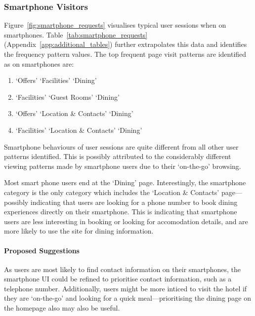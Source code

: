 \begin{landscape}
\pagestyle{empty}
\end{landscape}

\subsubsection{Smartphone Visitors}
\label{sec:results:platform:smartphone}

Figure~\ref{fig:smartphone_requests} visualises typical user sessions when on smartphones. Table~\ref{tab:smartphone_requests}  (Appendix~\ref{app:additional_tables}) further extrapolates this data and identifies the frequency pattern values. The top frequent page visit patterns are identified as on smartphones are:

\begin{enumerate}
  \item `Offers' \ra{} `Facilities' \ra{} `Dining'
  \item `Facilities' \ra{} `Guest Rooms' \ra{} `Dining'
  \item `Offers' \ra{} `Location \& Contacts' \ra{} `Dining'
  \item `Facilities' \ra{} `Location \& Contacts' \ra{} `Dining'
\end{enumerate}

Smartphone behaviours of user sessions are quite different from all other user patterns identified. This is possibly attributed to the considerably different viewing patterns made by smartphone users due to their `on-the-go' browsing.

Most smart phone users end at the `Dining' page. Interestingly, the smartphone category is the only category which includes the `Location \& Contacts' page---possibly indicating that users are looking for a phone number to book dining experiences directly on their smartphone. This is indicating that smartphone users are less interesting in booking or looking for accomodation details, and are more likely to use the site for dining information.

\paragraph{Proposed Suggestions} As users are most likely to find contact information on their smartphones, the smartphone UI could be refined to prioritise contact information, such as a telephone number. Additionally, users might be more inticed to visit the hotel if they are `on-the-go' and looking for a quick meal---prioritising the dining page on the homepage also may also be useful.

